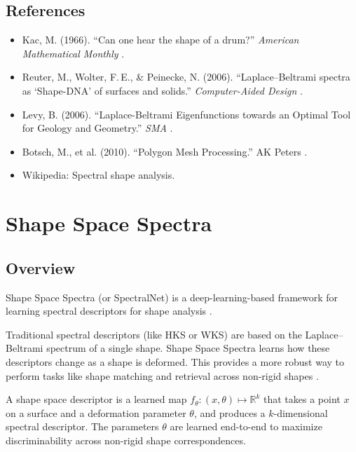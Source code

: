 \subsection{References}
\begin{itemize}
  \item Kac, M. (1966). ``Can one hear the shape of a drum?'' \textit{American Mathematical Monthly} \cite{kac1966}.
  \item Reuter, M., Wolter, F.\,E., \& Peinecke, N. (2006). ``Laplace--Beltrami spectra as `Shape-DNA' of surfaces and solids.'' \textit{Computer-Aided Design} \cite{reuter2006}.
  \item Levy, B. (2006). ``Laplace-Beltrami Eigenfunctions towards an Optimal Tool for Geology and Geometry.'' \textit{SMA} \cite{levy2006}.
  \item Botsch, M., et al. (2010). ``Polygon Mesh Processing.'' AK Peters \cite{botsch2010}.
  \item Wikipedia: Spectral shape analysis.
\end{itemize}

\section{Shape Space Spectra}
\label{sec:shape_space_spectra}

\subsection{Overview}
Shape Space Spectra (or SpectralNet) is a deep-learning-based framework for learning spectral descriptors for shape analysis \cite{sharp2025}.

Traditional spectral descriptors (like HKS or WKS) are based on the Laplace--Beltrami spectrum of a single shape. Shape Space Spectra learns how these descriptors change as a shape is deformed. This provides a more robust way to perform tasks like shape matching and retrieval across non-rigid shapes \cite{bronstein2017}.

\begin{definition}\label{def:shape_space_descriptor}
A shape space descriptor is a learned map $f_\theta: (x, \theta) \mapsto \mathbb{R}^k$ that takes a point $x$ on a surface and a deformation parameter $\theta$, and produces a $k$-dimensional spectral descriptor. The parameters $\theta$ are learned end-to-end to maximize discriminability across non-rigid shape correspondences.
\end{definition}

